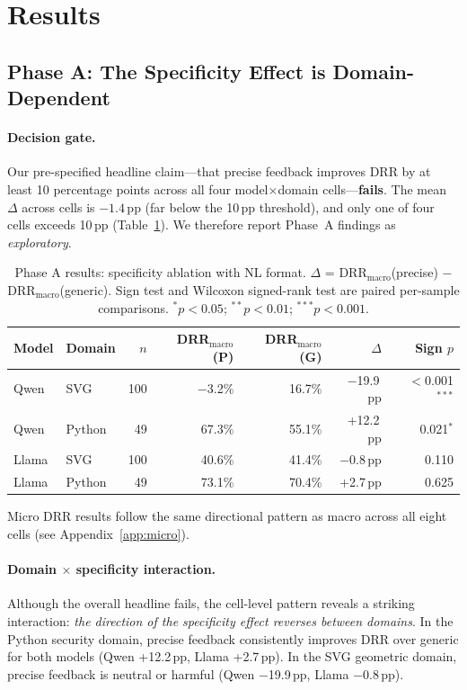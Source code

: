 \section{Results}
\label{sec:results}

\subsection{Phase A: The Specificity Effect is Domain-Dependent}
\label{sec:results-phaseA}

\paragraph{Decision gate.}
Our pre-specified headline claim---that precise feedback improves DRR by at least 10 percentage points across all four model$\times$domain cells---\textbf{fails}. The mean $\Delta$ across cells is $-1.4$\,pp (far below the 10\,pp threshold), and only one of four cells exceeds 10\,pp (Table~\ref{tab:phaseA}). We therefore report Phase~A findings as \emph{exploratory}.

\begin{table}[t]
\centering
\small
\caption{Phase A results: specificity ablation with NL format. $\Delta$ = DRR$_{\text{macro}}$(precise) $-$ DRR$_{\text{macro}}$(generic). Sign test and Wilcoxon signed-rank test are paired per-sample comparisons. $^{*}p < 0.05$; $^{**}p < 0.01$; $^{***}p < 0.001$.}
\label{tab:phaseA}
\begin{tabular}{llrrrrr}
\toprule
Model & Domain & $n$ & DRR$_\text{macro}$(P) & DRR$_\text{macro}$(G) & $\Delta$ & Sign $p$ \\
\midrule
Qwen & SVG & 100 & $-$3.2\% & 16.7\% & $-$19.9\,pp & $<$0.001$^{***}$ \\
Qwen & Python & 49 & 67.3\% & 55.1\% & +12.2\,pp & 0.021$^{*}$ \\
Llama & SVG & 100 & 40.6\% & 41.4\% & $-$0.8\,pp & 0.110 \\
Llama & Python & 49 & 73.1\% & 70.4\% & +2.7\,pp & 0.625 \\
\bottomrule
\end{tabular}
\end{table}

Micro DRR results follow the same directional pattern as macro across all eight cells (see Appendix~\ref{app:micro}).

\paragraph{Domain $\times$ specificity interaction.}
Although the overall headline fails, the cell-level pattern reveals a striking interaction: \emph{the direction of the specificity effect reverses between domains}. In the Python security domain, precise feedback consistently improves DRR over generic for both models (Qwen +12.2\,pp, Llama +2.7\,pp). In the SVG geometric domain, precise feedback is neutral or harmful (Qwen $-$19.9\,pp, Llama $-$0.8\,pp).

